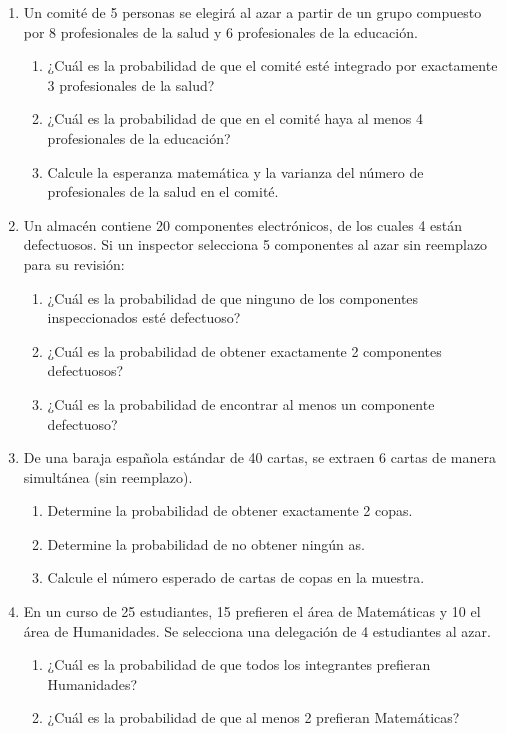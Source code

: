 \documentclass[letterpaper,12pt,spanish]{article}
\begin{document}
\begin{enumerate}[label=\arabic*.]
    \item Un comité de 5 personas se elegirá al azar a partir de un grupo compuesto por 8 profesionales de la salud y 6 profesionales de la educación.
    \begin{enumerate}[label=\alph*)]
        \item ¿Cuál es la probabilidad de que el comité esté integrado por exactamente 3 profesionales de la salud?
        \item ¿Cuál es la probabilidad de que en el comité haya al menos 4 profesionales de la educación?
        \item Calcule la esperanza matemática y la varianza del número de profesionales de la salud en el comité.
    \end{enumerate}

    \item Un almacén contiene 20 componentes electrónicos, de los cuales 4 están defectuosos. Si un inspector selecciona 5 componentes al azar sin reemplazo para su revisión:
    \begin{enumerate}[label=\alph*)]
        \item ¿Cuál es la probabilidad de que ninguno de los componentes inspeccionados esté defectuoso?
        \item ¿Cuál es la probabilidad de obtener exactamente 2 componentes defectuosos?
        \item ¿Cuál es la probabilidad de encontrar al menos un componente defectuoso?
    \end{enumerate}

    \item De una baraja española estándar de 40 cartas, se extraen 6 cartas de manera simultánea (sin reemplazo).
    \begin{enumerate}[label=\alph*)]
        \item Determine la probabilidad de obtener exactamente 2 copas.
        \item Determine la probabilidad de no obtener ningún as.
        \item Calcule el número esperado de cartas de copas en la muestra.
    \end{enumerate}

    \item En un curso de 25 estudiantes, 15 prefieren el área de Matemáticas y 10 el área de Humanidades. Se selecciona una delegación de 4 estudiantes al azar.
    \begin{enumerate}[label=\alph*)]
        \item ¿Cuál es la probabilidad de que todos los integrantes prefieran Humanidades?
        \item ¿Cuál es la probabilidad de que al menos 2 prefieran Matemáticas?
    \end{enumerate}


\end{enumerate}
\end{document}
